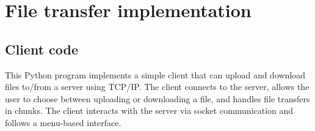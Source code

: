 \documentclass{article}
\begin{document}
\thispagestyle{empty}
    \newpage


\section{File transfer implementation}

\subsection{Client code}
This Python program implements a simple client that can upload and download files to/from a server using TCP/IP. The client connects to the server, allows the user to choose between uploading or downloading a file, and handles file transfers in chunks. The client interacts with the server via socket communication and follows a menu-based interface.
\thispagestyle{empty}
    \newpage
    
\end{document}

